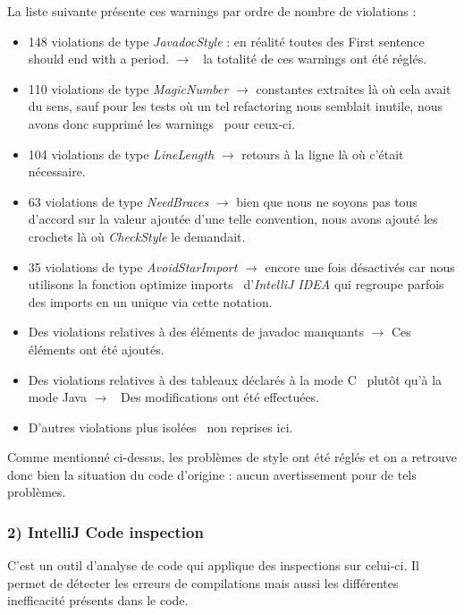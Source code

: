 \documentclass[12pt, openany]{report}
\begin{document}
La liste suivante présente ces warnings par ordre de nombre de \og violations \fg :\\
\begin{itemize}
	\item 148 violations de type \textit{JavadocStyle} : en réalité toutes des \og First sentence should end with a period. \fg $\rightarrow$ \, la totalité de ces warnings ont été réglés. 
	\item 110 violations de type \textit{MagicNumber} $\rightarrow$ constantes extraites là où cela avait du sens, sauf pour les tests où un tel refactoring nous semblait inutile, nous avons donc supprimé les \og warnings \fg \, pour ceux-ci.
	\item 104 violations de type \textit{LineLength} $\rightarrow$ retours à la ligne là où c'était nécessaire.
	\item 63 violations de type \textit{NeedBraces} $\rightarrow$ bien que nous ne soyons pas tous d'accord sur la valeur ajoutée d'une telle convention, nous avons ajouté les crochets là où \textit{CheckStyle} le demandait.
	\item 35 violations de type \textit{AvoidStarImport} $\rightarrow$ encore une fois désactivés car nous utilisons la fonction \og optimize imports \fg \, d'\textit{IntelliJ IDEA} qui regroupe parfois des imports en un unique via cette notation.
	\item Des violations relatives à des éléments de javadoc manquants $\rightarrow$ Ces éléments ont été ajoutés.
	\item Des violations relatives à des tableaux déclarés à la \og mode C \fg \, plutôt qu'à la \og mode Java \fg $\rightarrow$ \, Des modifications ont été effectuées.
	\item D'autres violations plus \og isolées \fg \, non reprises ici.
\end{itemize}
Comme mentionné ci-dessus, les problèmes de style ont été réglés et on a retrouve donc bien la situation du code d'origine : aucun avertissement pour de tels problèmes.

\subsubsection*{2) IntelliJ Code inspection}

C'est un outil d'analyse de code qui applique des inspections sur celui-ci. Il permet de détecter les erreurs de compilations mais aussi les différentes inefficacité présents dans le code.
\end{document}
